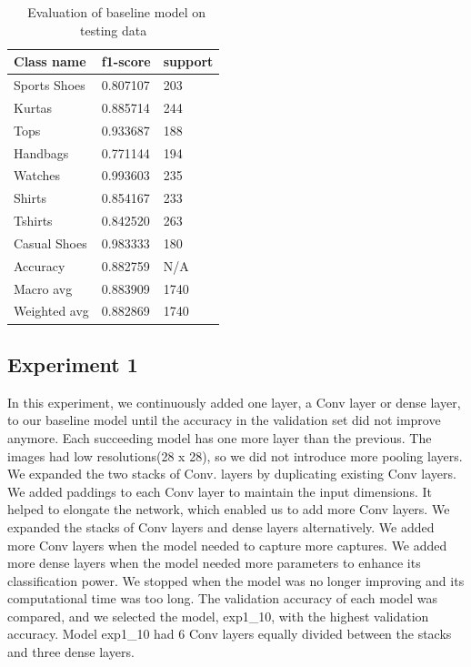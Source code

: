 \documentclass[twoside,twocolumn,9pt]{article}
\begin{document}
\begin{table}[h]
\small
  \caption{\ Evaluation of baseline model on testing data}
  \label{tbl:example1}
  \begin{tabular*}{0.48\textwidth}{@{\extracolsep{\fill}}lll}
    \hline
    Class name & f1-score & support \\
    \hline
    Sports Shoes & 0.807107 & 203 \\
    Kurtas & 0.885714 & 244 \\
    Tops & 0.933687 & 188 \\
    Handbags & 0.771144 & 194 \\
    Watches & 0.993603 & 235 \\
    Shirts & 0.854167 & 233 \\
    Tshirts & 0.842520 & 263 \\
    Casual Shoes & 0.983333 & 180 \\
    Accuracy & 0.882759 & N/A \\
    Macro avg & 0.883909 & 1740 \\
    Weighted avg & 0.882869 & 1740 \\
    \hline
  \end{tabular*}
\end{table}

\subsection{Experiment 1}

In this experiment, we continuously added one layer, a Conv layer or dense layer, to our baseline model until the accuracy in the validation set did not improve anymore. Each succeeding model has one more layer than the previous. The images had low resolutions(28 x 28), so we did not introduce more pooling layers. We expanded the two stacks of Conv. layers by duplicating existing Conv layers. We added paddings to each Conv layer to maintain the input dimensions. It helped to elongate the network, which enabled us to add more Conv layers. We expanded the stacks of Conv layers and dense layers alternatively. We added more Conv layers when the model needed to capture more captures. We added more dense layers when the model needed more parameters to enhance its classification power. We stopped when the model was no longer improving and its computational time was too long. The validation accuracy of each model was compared, and we selected the model, exp1\_10, with the highest validation accuracy. Model exp1\_10 had 6 Conv layers equally divided between the stacks and three dense layers.
\end{document}
